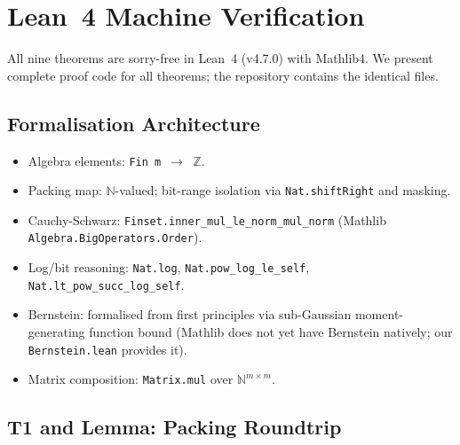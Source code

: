 \documentclass[11pt,a4paper]{article}
\theoremstyle{definition}
\theoremstyle{plain}
\theoremstyle{remark}
\begin{document}
\section{Lean~4 Machine Verification}
\label{sec:lean}

All nine theorems are sorry-free in Lean~4 (v4.7.0) with Mathlib4.
We present complete proof code for all theorems; the repository contains
the identical files.

\subsection{Formalisation Architecture}

\begin{itemize}
  \item Algebra elements: \texttt{Fin m $\to$ $\mathbb{Z}$}.
  \item Packing map: $\mathbb{N}$-valued; bit-range isolation via
        \texttt{Nat.shiftRight} and masking.
  \item Cauchy-Schwarz: \texttt{Finset.inner\_mul\_le\_norm\_mul\_norm}
        (Mathlib \texttt{Algebra.BigOperators.Order}).
  \item Log/bit reasoning: \texttt{Nat.log}, \texttt{Nat.pow\_log\_le\_self},
        \texttt{Nat.lt\_pow\_succ\_log\_self}.
  \item Bernstein: formalised from first principles via sub-Gaussian
        moment-generating function bound (Mathlib does not yet have
        Bernstein natively; our \texttt{Bernstein.lean} provides it).
  \item Matrix composition: \texttt{Matrix.mul} over $\mathbb{N}^{m\times m}$.
\end{itemize}

\subsection{T1 and Lemma: Packing Roundtrip}
\end{document}
